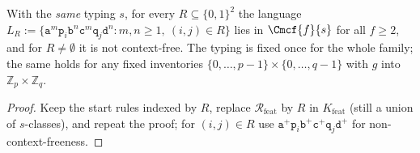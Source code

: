 \begin{corollary}
\label{cor:feature-relation-family}
With the \emph{same} typing $s$, for every $R\subseteq\{0,1\}^2$ the language
$L_R:=\{\mathtt a^m\mathtt p_i\mathtt b^n\mathtt c^m\mathtt q_j\mathtt d^n:m,n\ge1,
\ (i,j)\in R\}$ lies in $\Cmcf{f}{s}$ for all $f\ge2$, and for $R\ne\emptyset$ it is
not context-free.  The typing is fixed once for the whole family; the same holds for
any fixed inventories $\{0,\ldots,p-1\}\times\{0,\ldots,q-1\}$ with $g$ into
$\mathbb Z_p\times\mathbb Z_q$.
\end{corollary}

\begin{proof}
Keep the start rules indexed by $R$, replace $\mathcal R_{\mathrm{feat}}$ by $R$ in
$K_{\mathrm{feat}}$ (still a union of $s$-classes), and repeat the proof; for
$(i,j)\in R$ use $\mathtt a^+\mathtt p_i\mathtt b^+\mathtt c^+\mathtt q_j\mathtt d^+$
for non-context-freeness.
\end{proof}

